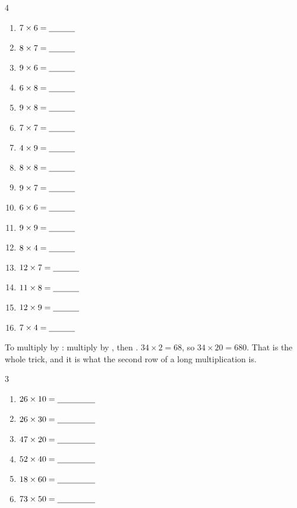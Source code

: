 \documentclass[12pt,a4paper]{article}
\begin{document}
\vspace{7pt}
\begin{multicols}{4}
\begin{enumerate}[label=(\alph*), itemsep=9pt]
  \item $7 \times 6 = \blank[1.1cm]$
  \item $8 \times 7 = \blank[1.1cm]$
  \item $9 \times 6 = \blank[1.1cm]$
  \item $6 \times 8 = \blank[1.1cm]$
  \item $9 \times 8 = \blank[1.1cm]$
  \item $7 \times 7 = \blank[1.1cm]$
  \item $4 \times 9 = \blank[1.1cm]$
  \item $8 \times 8 = \blank[1.1cm]$
  \item $9 \times 7 = \blank[1.1cm]$
  \item $6 \times 6 = \blank[1.1cm]$
  \item $9 \times 9 = \blank[1.1cm]$
  \item $8 \times 4 = \blank[1.1cm]$
  \item $12 \times 7 = \blank[1.1cm]$
  \item $11 \times 8 = \blank[1.1cm]$
  \item $12 \times 9 = \blank[1.1cm]$
  \item $7 \times 4 = \blank[1.1cm]$
\end{enumerate}
\end{multicols}


\begin{remember}
  To multiply by : multiply by , then .
  $34 \times 2 = 68$, so $34 \times 20 = 680$. That is the whole trick, and it is
  what the second row of a long multiplication is.
\end{remember}

\vspace{2pt}
\begin{multicols}{3}
\begin{enumerate}[label=(\alph*), itemsep=9pt]
  \item $26 \times 10 = \blank[1.6cm]$
  \item $26 \times 30 = \blank[1.6cm]$
  \item $47 \times 20 = \blank[1.6cm]$
  \item $52 \times 40 = \blank[1.6cm]$
  \item $18 \times 60 = \blank[1.6cm]$
  \item $73 \times 50 = \blank[1.6cm]$
\end{enumerate}
\end{multicols}
\end{document}
